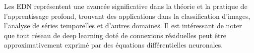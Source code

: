 \begin{enumerate}
    Les EDN représentent une avancée significative dans la théorie et la pratique de l'apprentissage profond, trouvant des applications dans la classification d'images, l'analyse de séries temporelles et d'autres domaines. Il est intéressant de noter que tout réseau de deep learning doté de connexions résiduelles peut être approximativement exprimé par des équations différentielles neuronales.
\end{enumerate}